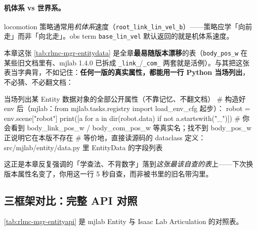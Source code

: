\paragraph{机体系 vs 世界系。}locomotion 策略通常用\emph{机体系}速度（\verb|root_link_lin_vel_b|）——策略应学「向前走」而非「向北走」。obs term \verb|base_lin_vel| 默认返回的就是机体系速度。

\begin{insight}\label{ins:rlmc-mgr-introspect}
本章这张 \cref{tab:rlmc-mgr-entitydata} 是全章\textbf{最易随版本漂移}的表（\verb|body_pos_w| 在某些旧文档里有、mjlab 1.4.0 已拆成 \texttt{\_link\_}/\texttt{\_com\_} 两套就是活例）。与其把这张表当字典背，不如记住：\textbf{任何一版的真实属性，都能用一行 Python 当场列出}，不必猜、不必翻文档：
\begin{codebox}[Python]{当场列出某 Entity 数据对象的全部公开属性（不靠记忆、不翻文档）}
# 构造好 env 后（mjlab：from mjlab.tasks.registry import load_env_cfg 起步）：
robot = env.scene["robot"]
print([a for a in dir(robot.data) if not a.startswith("_")])
# 你会看到 body_link_pos_w / body_com_pos_w 等真实名；找不到 body_pos_w 正说明它在本版不存在
# 等价地，直接读源码的 dataclass 定义：src/mjlab/entity/data.py 里 EntityData 的字段列表
\end{codebox}
\noindent 这正是本章反复强调的「学查法、不背数字」落到\emph{这张最该自查的表}上——下次换版本属性名变了，你用这一行 5 秒自查，而非被书里的旧名带沟里。
\end{insight}

\subsection{三框架对比：完整 API 对照}

\cref{tab:rlmc-mgr-entityapi} 是 mjlab Entity 与 Isaac Lab Articulation 的对照表。

